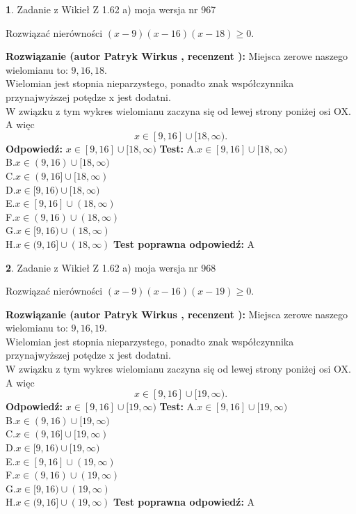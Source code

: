 \documentclass[12pt, a4paper]{article}
\theoremstyle{definition} %
\newtheorem{zad}{}
\newcommand{\zadStart}[1]{\begin{zad}#1\newline}
\newcommand{\zadStop}{\end{zad}}
\newcommand{\rozwStart}[2]{\noindent \textbf{Rozwiązanie (autor #1 , recenzent #2): }\newline}
\newcommand{\rozwStop}{\newline}
\newcommand{\odpStart}{\noindent \textbf{Odpowiedź:}\newline}
\newcommand{\odpStop}{\newline}
\newcommand{\testStart}{\noindent \textbf{Test:}\newline}
\newcommand{\testStop}{\newline}
\newcommand{\kluczStart}{\noindent \textbf{Test poprawna odpowiedź:}\newline}
\newcommand{\kluczStop}{\newline}
\begin{document}
\zadStart{Zadanie z Wikieł Z 1.62 a) moja wersja nr 967}

Rozwiązać nierówności $(x-9)(x-16)(x-18)\ge0$.
\zadStop
\rozwStart{Patryk Wirkus}{}
Miejsca zerowe naszego wielomianu to: $9, 16, 18$.\\
Wielomian jest stopnia nieparzystego, ponadto znak współczynnika przy\linebreak najwyższej potędze x jest dodatni.\\ W związku z tym wykres wielomianu zaczyna się od lewej strony poniżej osi OX. A więc $$x \in [9,16] \cup [18,\infty).$$
\rozwStop
\odpStart
$x \in [9,16] \cup [18,\infty)$
\odpStop
\testStart
A.$x \in [9,16] \cup [18,\infty)$\\
B.$x \in (9,16) \cup [18,\infty)$\\
C.$x \in (9,16] \cup [18,\infty)$\\
D.$x \in [9,16) \cup [18,\infty)$\\
E.$x \in [9,16] \cup (18,\infty)$\\
F.$x \in (9,16) \cup (18,\infty)$\\
G.$x \in [9,16) \cup (18,\infty)$\\
H.$x \in (9,16] \cup (18,\infty)$
\testStop
\kluczStart
A
\kluczStop



\zadStart{Zadanie z Wikieł Z 1.62 a) moja wersja nr 968}

Rozwiązać nierówności $(x-9)(x-16)(x-19)\ge0$.
\zadStop
\rozwStart{Patryk Wirkus}{}
Miejsca zerowe naszego wielomianu to: $9, 16, 19$.\\
Wielomian jest stopnia nieparzystego, ponadto znak współczynnika przy\linebreak najwyższej potędze x jest dodatni.\\ W związku z tym wykres wielomianu zaczyna się od lewej strony poniżej osi OX. A więc $$x \in [9,16] \cup [19,\infty).$$
\rozwStop
\odpStart
$x \in [9,16] \cup [19,\infty)$
\odpStop
\testStart
A.$x \in [9,16] \cup [19,\infty)$\\
B.$x \in (9,16) \cup [19,\infty)$\\
C.$x \in (9,16] \cup [19,\infty)$\\
D.$x \in [9,16) \cup [19,\infty)$\\
E.$x \in [9,16] \cup (19,\infty)$\\
F.$x \in (9,16) \cup (19,\infty)$\\
G.$x \in [9,16) \cup (19,\infty)$\\
H.$x \in (9,16] \cup (19,\infty)$
\testStop
\kluczStart
A
\kluczStop
\end{document}
